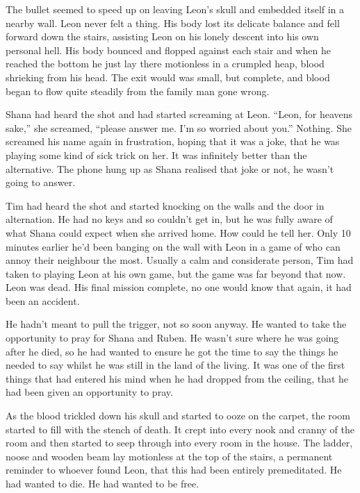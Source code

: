 The bullet seemed to speed up on leaving Leon's skull and embedded itself in a nearby wall.  Leon never felt a thing.  His body lost its delicate balance and fell forward down the stairs, assisting Leon on his lonely descent into his own personal hell.  His body bounced and flopped against each stair and when he reached the bottom he just lay there motionless in a crumpled heap, blood shrieking from his head.  The exit would was small, but complete, and blood began to flow quite steadily from the family man gone wrong.

Shana had heard the shot and had started screaming at Leon.  ``Leon, for heavens sake,'' she screamed, ``please answer me.  I'm so worried about you.''  Nothing.  She screamed his name again in frustration, hoping that it was a joke, that he was playing some kind of sick trick on her.  It was infinitely better than the alternative.  The phone hung up as Shana realised that joke or not, he wasn't going to answer.

Tim had heard the shot and started knocking on the walls and the door in alternation.  He had no keys and so couldn't get in, but he was fully aware of what Shana could expect when she arrived home.  How could he tell her.  Only 10 minutes earlier he'd been banging on the wall with Leon in a game of who can annoy their neighbour the most.  Usually a calm and considerate person, Tim had taken to playing Leon at his own game, but the game was far beyond that now.  Leon was dead.  His final mission complete, no one would know that again, it had been an accident.  

He hadn't meant to pull the trigger, not so soon anyway.  He wanted to take the opportunity to pray for Shana and Ruben.  He wasn't sure where he was going after he died, so he had wanted to ensure he got the time to say the things he needed to say whilst he was still in the land of the living.  It was one of the first things that had entered his mind when he had dropped from the ceiling, that he had been given an opportunity to pray.

As the blood trickled down his skull and started to ooze on the carpet, the room started to fill with the stench of death.  It crept into every nook and cranny of the room and then started to seep through into every room in the house.  The ladder, noose and wooden beam lay motionless at the top of the stairs, a permanent reminder to whoever found Leon, that this had been entirely premeditated.  He had wanted to die.  He had wanted to be free.

